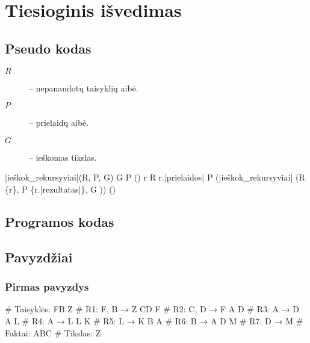 \chapter{Tiesioginis išvedimas}

\section{Pseudo kodas}

\begin{description}
  \item[$R$] – nepanaudotų taisyklių aibė.
  \item[$P$] – prielaidų aibė.
  \item[$G$] – ieškomas tikslas.
\end{description}
\begin{program}
  \FUNCT |ieškok_rekursyviai|(R, P, G) \BODY
    \IF G \in P \THEN \EXIT(\true) \FI
    \FOREACH r \in R \; \DO
      \IF r.|prielaidos| \subseteq P
      \THEN \EXIT(|ieškok_rekursyviai|%
        (R \setminus \{r\}, P \cup \{r.|rezultatas|\}, G ))
      \FI
    \OD
    \EXIT(\false)%
  \ENDFUNCT
\end{program}

\section{Programos kodas}


\section{Pavyzdžiai}

\subsection{Pirmas pavyzdys}

\begin{pythonaienv}[fc]
# Taisyklės:
FB Z                                    # R1: F, B → Z
CD F                                    # R2: C, D → F
A D                                     # R3: A → D
A L                                     # R4: A → L
L K                                     # R5: L → K
B A                                     # R6: B → A
D M                                     # R7: D → M
# Faktai:
ABC
# Tikslas:
Z
\end{pythonaienv}


